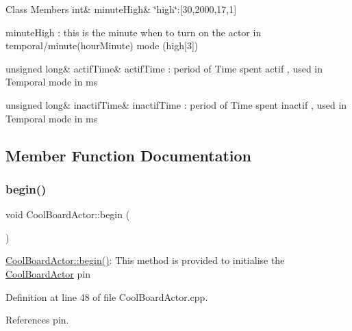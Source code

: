 \begin{DoxyFields}{Class Members}
\mbox{\label{class_cool_board_actor_a4bff3d61ead74adb60be224764b93006}} 
int&
minuteHigh&
\char`\"{}high\char`\"{}\+:\mbox{[}30,2000,17,1\mbox{]}

minute\+High \+: this is the minute when to turn on the actor in temporal/minute(hour\+Minute) mode (high\mbox{[}3\mbox{]}) \\
\hline

\mbox{\label{class_cool_board_actor_a534119a22a09b29ecb446b277d5b2ef5}} 
unsigned long&
actifTime&
actif\+Time \+: period of Time spent actif , used in Temporal mode in ms \\
\hline

\mbox{\label{class_cool_board_actor_a6d88835f4402b3b81cd404784281854b}} 
unsigned long&
inactifTime&
inactif\+Time \+: period of Time spent inactif , used in Temporal mode in ms \\
\hline

\end{DoxyFields}


\subsection{Member Function Documentation}
\mbox{\label{class_cool_board_actor_a7f4422fd85a5510bc2cdfd68e109be5e}} 
\subsubsection{\texorpdfstring{begin()}{begin()}}
{\footnotesize\ttfamily void Cool\+Board\+Actor\+::begin (\begin{DoxyParamCaption}{ }\end{DoxyParamCaption})}

\hyperlink{class_cool_board_actor_a7f4422fd85a5510bc2cdfd68e109be5e}{Cool\+Board\+Actor\+::begin()}\+: This method is provided to initialise the \hyperlink{class_cool_board_actor}{Cool\+Board\+Actor} pin 

Definition at line 48 of file Cool\+Board\+Actor.\+cpp.



References pin.



